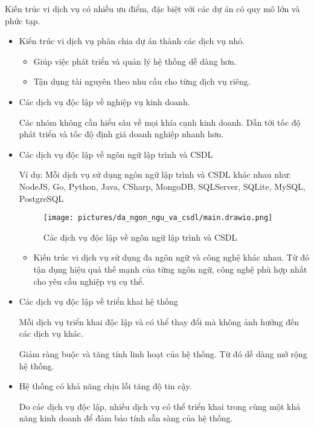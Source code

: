 Kiến trúc vi dịch vụ có nhiều ưu điểm, đặc biệt với các dự án có quy mô lớn và phức tạp.

\begin{itemize}

\item Kiến trúc vi dịch vụ phân chia dự án thành các dịch vụ nhỏ.

\begin{itemize}

\item Giúp việc phát triển và quản lý hệ thống dễ dàng hơn.

\item Tận dụng tài nguyên theo nhu cầu cho từng dịch vụ riêng.

\end{itemize}

\item Các dịch vụ độc lập về nghiệp vụ kinh doanh.

Các nhóm không cần hiểu sâu về mọi khía cạnh kinh doanh. Dẫn tới tốc độ phát triển và tốc độ định giá doanh nghiệp nhanh hơn.

\item Các dịch vụ độc lập về ngôn ngữ lập trình và CSDL

Ví dụ: Mỗi dịch vụ sử dụng ngôn ngữ lập trình và CSDL khác nhau như: NodeJS, Go, Python, Java, CSharp, MongoDB, SQLServer, SQLite, MySQL, PostgreSQL

\begin{figure}[H]

\centering

\texttt{[image: pictures/da\_ngon\_ngu\_va\_csdl/main.drawio.png]}

\caption{Các dịch vụ độc lập về ngôn ngữ lập trình và CSDL}

\end{figure}

\begin{itemize}

\item Kiến trúc vi dịch vụ sử dụng đa ngôn ngữ và công nghệ khác nhau. Từ đó tận dụng hiệu quả thế mạnh của từng ngôn ngữ, công nghệ phù hợp nhất cho yêu cầu nghiệp vụ cụ thể.


\end{itemize}

\item Các dịch vụ độc lập về triển khai hệ thống

Mỗi dịch vụ triển khai độc lập và có thể thay đổi mà không ảnh hưởng đến các dịch vụ khác.

Giảm ràng buộc và tăng tính linh hoạt của hệ thống. Từ đó dễ dàng mở rộng hệ thống.

\item Hệ thống có khả năng chịu lỗi tăng độ tin cậy.

Do các dịch vụ độc lập, nhiều dịch vụ có thể triển khai trong cùng một khả năng kinh doanh để đảm bảo tính sẵn sàng của hệ thống.

\end{itemize}
